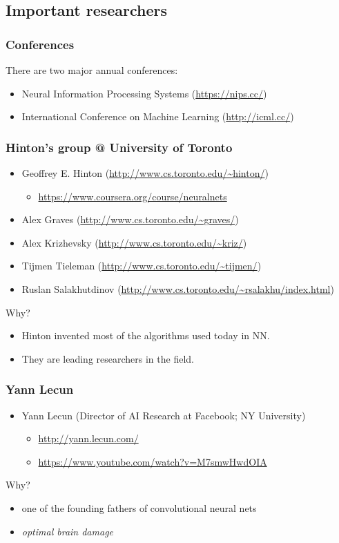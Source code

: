 \subsection{Important researchers}
\label{sec:researchers}

\begin{frame}
  \frametitle{Conferences}
  There are two major annual conferences:
  \begin{itemize}
  \item Neural Information Processing Systems (\url{https://nips.cc/})
  \item International Conference on Machine Learning (\url{http://icml.cc/})
  \end{itemize}
\end{frame}

\begin{frame}
  \frametitle{Hinton's group @ University of Toronto}
  \begin{itemize}
  \item Geoffrey E. Hinton (\url{http://www.cs.toronto.edu/~hinton/})
    \begin{itemize}
    \item \url{https://www.coursera.org/course/neuralnets}
    \end{itemize}
  \item Alex Graves (\url{http://www.cs.toronto.edu/~graves/})
  \item Alex Krizhevsky (\url{http://www.cs.toronto.edu/~kriz/})
  \item Tijmen Tieleman (\url{http://www.cs.toronto.edu/~tijmen/})
  \item Ruslan Salakhutdinov (\url{http://www.cs.toronto.edu/~rsalakhu/index.html})
  \end{itemize}
  Why?
  \begin{itemize}
  \item Hinton invented most of the algorithms used today in NN.
  \item They are leading researchers in the field.
  \end{itemize}
\end{frame}

\begin{frame}
  \frametitle{Yann Lecun}
  \begin{itemize}
  \item Yann Lecun (Director of AI Research at Facebook; NY University)
    \begin{itemize}
    \item \url{http://yann.lecun.com/}
    \item \url{https://www.youtube.com/watch?v=M7smwHwdOIA}
    \end{itemize}
  \end{itemize}
  Why?
  \begin{itemize}
  \item one of the founding fathers of convolutional neural nets
  \item \emph{optimal brain damage}
  \end{itemize}
\end{frame}

